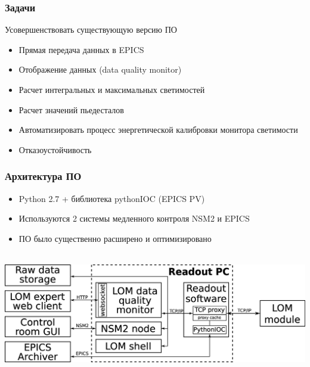 \documentclass{beamer}
\begin{document}
\begin{frame}
\frametitle{Задачи}
Усовершенствовать существующую версию ПО\\
  \begin{itemize}
    \item Прямая передача данных в EPICS
    \item Отображение данных (data quality monitor)
    \item Расчет интегральных и максимальных светимостей
    \item Расчет значений пьедесталов
    \item Автоматизировать процесс энергетической калибровки монитора светимости
    \item Отказоустойчивость
  \end{itemize}
\end{frame}

\begin{frame}
\frametitle{Архитектура ПО}
  \begin{itemize}
    \item Python 2.7 + библиотека pythonIOC (EPICS PV)
    \item Используются 2 системы медленного контроля NSM2 и EPICS
    \item ПО было существенно расширено и оптимизировано 
    \\~\\
  \end{itemize}
\includegraphics[width=\textwidth]{LOM_software.png}
\end{frame}
\end{document}
